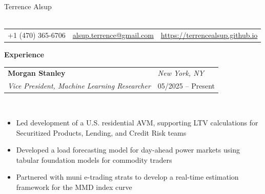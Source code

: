 \documentclass{article}
\begin{document}
\begin{center}
    {\Huge Terrence Alsup}\\
    ~\\
    \begin{tabular}{c | c | c}
        +1 (470) 365-6706 & \url{alsup.terrence@gmail.com} & \url{https://terrencealsup.github.io} \\
    \end{tabular}
\end{center}


\vspace{0.15in}

{\Large\bf Experience} \hrulefill \\

\begin{tabular}{p{4.8in}p{2in}}
    \bf{Morgan Stanley}  &  \emph{New York, NY} \\
    \emph{Vice President, Machine Learning Researcher} & 05/2025 -- Present\\
\end{tabular}
\vspace{-0.2in}
\begin{minipage}{0.03\textwidth}
~\\
\end{minipage}
\begin{minipage}{0.7\textwidth}
\begin{itemize}[label=\raisebox{0.25ex}{\tiny$\bullet$}]
    \item Led development of a U.S. residential AVM, supporting LTV calculations for Securitized Products, Lending, and Credit Risk teams
    \item Developed a load forecasting model for day-ahead power markets using tabular foundation models for commodity traders
    \item Partnered with muni e-trading strats to develop a real-time estimation framework for the MMD index curve
\end{itemize}
\end{minipage}

\vspace{0.35in}
\end{document}
